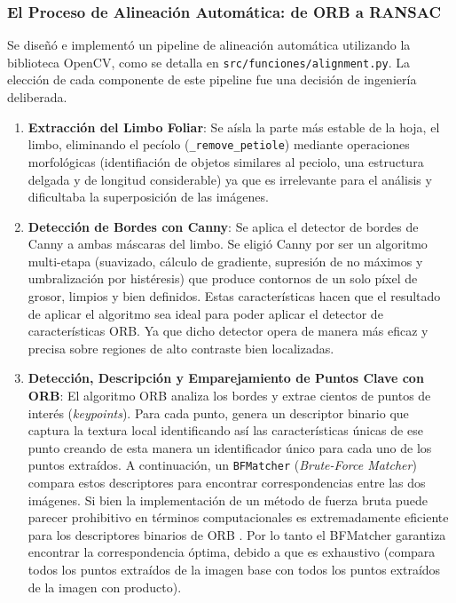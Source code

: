\subsubsection{\textbf{El Proceso de Alineación Automática: de ORB a RANSAC}}

Se diseñó e implementó un pipeline de alineación automática utilizando la biblioteca OpenCV, como se detalla en \verb|src/funciones/alignment.py|. La elección de cada componente de este pipeline fue una decisión de ingeniería deliberada.

\begin{enumerate}
    \item \textbf{Extracción del Limbo Foliar}: Se aísla la parte más estable de la hoja, el limbo, eliminando el pecíolo (\verb|_remove_petiole|) mediante operaciones morfológicas (identifiación de objetos similares al peciolo, una estructura delgada y de longitud considerable) ya que es irrelevante para el análisis y dificultaba la superposición de las imágenes.

    \item \textbf{Detección de Bordes con Canny}: Se aplica el detector de bordes de Canny\cite{OpenCV2025Canny} a ambas máscaras del limbo. Se eligió Canny por ser un algoritmo multi-etapa (suavizado, cálculo de gradiente, supresión de no máximos y umbralización por histéresis) que produce contornos de un solo píxel de grosor, limpios y bien definidos. Estas características hacen que el resultado de aplicar el algoritmo sea ideal para poder aplicar el detector de características ORB. Ya que dicho detector opera de manera más eficaz y precisa sobre regiones de alto contraste bien localizadas.

    \item \textbf{Detección, Descripción y Emparejamiento de Puntos Clave con ORB}: El algoritmo ORB analiza los bordes y extrae cientos de puntos de interés (\textit{keypoints}). Para cada punto, genera un descriptor binario que captura la textura local identificando así las características únicas de ese punto creando de esta manera un identificador único para cada uno de los puntos extraídos. A continuación, un \verb|BFMatcher| (\textit{Brute-Force Matcher}) compara estos descriptores para encontrar correspondencias entre las dos imágenes. Si bien la implementación de un método de fuerza bruta puede parecer  prohibitivo en términos computacionales es extremadamente eficiente para los descriptores binarios de ORB \cite{rs14184465}. Por lo tanto el BFMatcher garantiza encontrar la correspondencia óptima, debido a que es exhaustivo (compara todos los puntos extraídos  de la imagen base con todos los puntos extraídos de la imagen con producto).


\end{enumerate}
